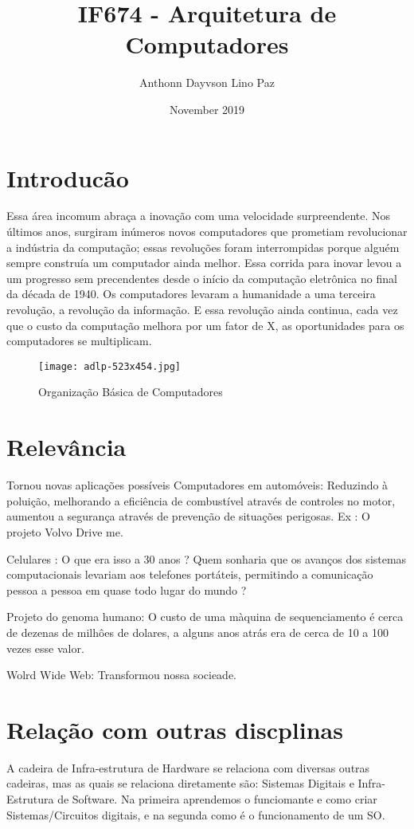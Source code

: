 \documentclass{article}
\title{IF674 - Arquitetura de Computadores}
\author{Anthonn Dayvson Lino Paz}
\date{November 2019}
\begin{document}
\maketitle

\section{Introducão}
Essa área incomum abraça a inovação com uma velocidade surpreendente. Nos últimos anos, surgiram inúmeros novos computadores que prometiam revolucionar a indústria da computação; essas revoluções foram interrompidas porque alguém sempre construía um computador ainda melhor.
Essa corrida para inovar levou a um progresso sem precendentes desde o início da computação eletrônica no final da década de 1940. Os computadores levaram a humanidade a uma terceira revolução, a revolução da informação. E essa revolução ainda continua, cada vez que o custo da computação melhora por um fator de X, as oportunidades para os computadores se multiplicam.
 \citep{org}



\begin{figure}[h!]
\centering
\texttt{[image: adlp-523x454.jpg]}
\caption{Organização Básica de Computadores\citep{img}}
\label{fig:adlp-523x454.jpg}
\end{figure}

\section{Relevância}
Tornou novas aplicações possíveis
    Computadores em automóveis: Reduzindo à  poluição, melhorando a eficiência de combustível através  de  controles no motor, aumentou a segurança através de prevenção de situações perigosas.
    Ex : O projeto Volvo Drive me.
    
    Celulares : O que era isso a 30  anos ? Quem sonharia que os avanços dos sistemas computacionais levariam aos telefones portáteis, permitindo a comunicação pessoa a pessoa em quase todo lugar do mundo ?
    
    Projeto do genoma humano: O custo de uma màquina de sequenciamento é cerca de dezenas de milhôes de dolares, a alguns anos atrás era de cerca de 10 a 100 vezes esse valor.
    
    Wolrd Wide Web: Transformou nossa socieade.
     \citep{org}
   
  \section{Relação com outras discplinas}
  A cadeira de Infra-estrutura de Hardware se relaciona com diversas outras cadeiras, mas as quais se relaciona diretamente são: Sistemas Digitais e Infra-Estrutura de Software. Na primeira aprendemos o funciomante e como criar Sistemas/Circuitos digitais, e na segunda como é o funcionamento de um SO.
    
\end{document}
